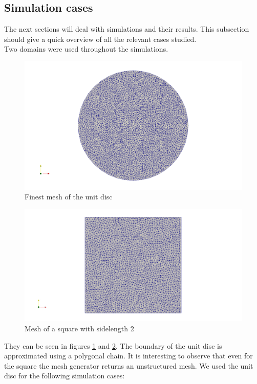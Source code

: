 \documentclass[12pt,a4paper,twoside, open=right]{scrreprt}
\theoremstyle{definition}
\theoremstyle{plain}
\begin{document}
\subsection{Simulation cases}
The next sections will deal with simulations and their results. This subsection should give a quick overview of all the relevant cases studied. \\
Two domains were used throughout the simulations. 
\begin{figure}
    \includegraphics[width=\textwidth]{meshcircle}
    \caption{Finest mesh of the unit disc}
    \label{fig:mesh}
\end{figure}
\begin{figure}
    \includegraphics[width=\textwidth]{meshsquare}
    \caption{Mesh of a square with sidelength 2}
    \label{fig:meshsquare}
\end{figure}
They can be seen in figures \ref{fig:mesh} and \ref{fig:meshsquare}. The boundary of the unit disc is approximated using a polygonal chain. It is interesting to observe that even for the square the mesh generator returns an unstructured mesh.
We used the unit disc for the following simulation cases:
\end{document}
